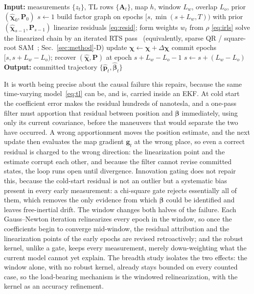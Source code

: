 \documentclass{IEEEtaes}
\begin{document}
\begin{algorithm}[t]
\caption{Fixed-lag sliding-window smoother}
\label{alg:window}
\begin{algorithmic}[1]
\State \textbf{Input:} measurements $\{z_t\}$, TL rows $\{\mathbf{A}_t\}$, map $h$,
window $L_w$, overlap $L_o$, prior $(\hat{\boldsymbol{\chi}}_0,\mathbf{P}_0)$
\State $s\gets 1$
  \State build factor graph on epochs $[s,\min(s{+}L_w,T))$ with prior
         $(\hat{\boldsymbol{\chi}}_{s-1},\mathbf{P}_{s-1})$
  \Repeat {}
    \State linearize residuals \eqref{eq:resid}; form weights $w_t$ from $\rho$
           \eqref{eq:irls}
    \State solve the linearized chain by an iterated RTS pass~\cite{rauch1965}
           (equivalently, sparse QR / square-root SAM~\cite{dellaert2006};
           Sec.~\ref{sec:method}-D)
    \State update $\boldsymbol{\chi}\gets\boldsymbol{\chi}+\Delta\boldsymbol{\chi}$
  \State commit epochs $[s,s{+}L_w{-}L_o)$; recover $(\hat{\boldsymbol{\chi}},
         \mathbf{P})$ at epoch $s{+}L_w{-}L_o{-}1$
  \State $s\gets s+(L_w-L_o)$
\EndWhile
\State \textbf{Output:} committed trajectory $\{\hat{\mathbf{p}}_t,
\hat{\boldsymbol{\beta}}_t\}$
\end{algorithmic}
\end{algorithm}

It is worth being precise about the causal failure this repairs, because the same
time-varying model~\eqref{eq:tl} can be, and is, carried inside an EKF. At cold
start the coefficient error makes the residual hundreds of nanotesla, and a
one-pass filter must apportion that residual between position and
$\boldsymbol{\beta}$ immediately, using only its current covariance, before the
maneuvers that would separate the two have occurred. A wrong apportionment moves the
position estimate, and the next update then evaluates the map gradient
$\mathbf{g}_t$ at the wrong place, so even a correct residual is charged to the
wrong direction: the linearization point and the estimate corrupt each other, and
because the filter cannot revise committed states, the loop runs open until
divergence. Innovation gating does not repair this, because the cold-start residual
is not an outlier but a systematic bias present in every early measurement:
a chi-square gate rejects essentially all of them, which removes the only evidence
from which $\boldsymbol{\beta}$ could be identified and leaves free-inertial drift.
The window changes both halves of the failure. Each Gauss--Newton iteration
relinearizes every epoch in the window, so once the coefficients begin to converge
mid-window, the residual attribution and the linearization points of the
early epochs are revised retroactively; and the robust kernel, unlike a
gate, keeps every measurement, merely down-weighting what the current model cannot
yet explain. The breadth study isolates the two effects: the window alone, with no
robust kernel, already stays bounded on every counted case, so the load-bearing mechanism is the windowed
relinearization, with the kernel as an accuracy refinement.
\end{document}

